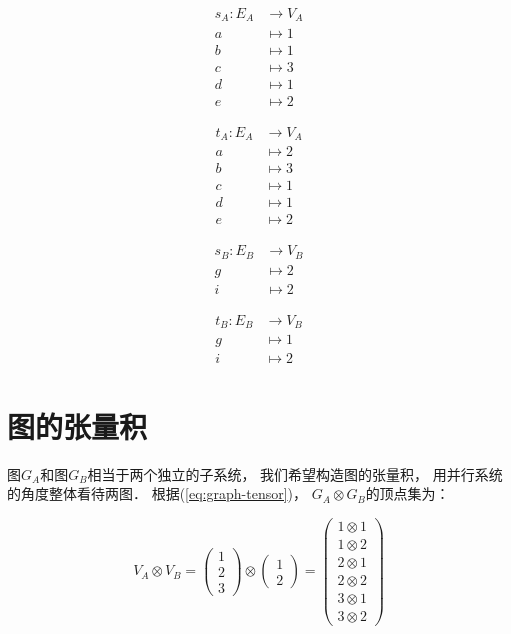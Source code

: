 \documentclass[10pt, openany]{book}
\begin{document}
\begin{minipage}{0.45\textwidth}
\[
\begin{aligned}
s_A: E_A &\to V_A \\
a &\mapsto 1 \\
b &\mapsto 1 \\
c &\mapsto 3 \\
d &\mapsto 1 \\
e &\mapsto 2
\end{aligned}
\]
\end{minipage}
\begin{minipage}{0.45\textwidth}
\[
\begin{aligned}
t_A: E_A &\to V_A \\
a &\mapsto 2 \\
b &\mapsto 3 \\
c &\mapsto 1 \\
d &\mapsto 1 \\
e &\mapsto 2
\end{aligned}
\]
\end{minipage}

\vspace{1em}
\begin{minipage}{0.45\textwidth}
\[
\begin{aligned}
s_B: E_B &\to V_B \\
g &\mapsto 2 \\
i &\mapsto 2
\end{aligned}
\]
\end{minipage}
\begin{minipage}{0.45\textwidth}
\[
\begin{aligned}
t_B: E_B &\to V_B \\
g &\mapsto 1 \\
i &\mapsto 2
\end{aligned}
\]
\end{minipage}


\section{图的张量积}

图$G_A$和图$G_B$相当于两个独立的子系统，
我们希望构造图的张量积，
用并行系统的角度整体看待两图．
根据(\ref{eq:graph-tensor})，
$G_A \otimes G_B$的顶点集为：

$$
V_A \otimes V_B = 
\begin{pmatrix}
1 \\ 2 \\ 3
\end{pmatrix}
\otimes
\begin{pmatrix}
1 \\ 2
\end{pmatrix}
=\begin{pmatrix}
1 \otimes 1 \\
1 \otimes 2 \\
2 \otimes 1 \\
2 \otimes 2 \\
3 \otimes 1 \\
3 \otimes 2 
\end{pmatrix}
$$
\end{document}
